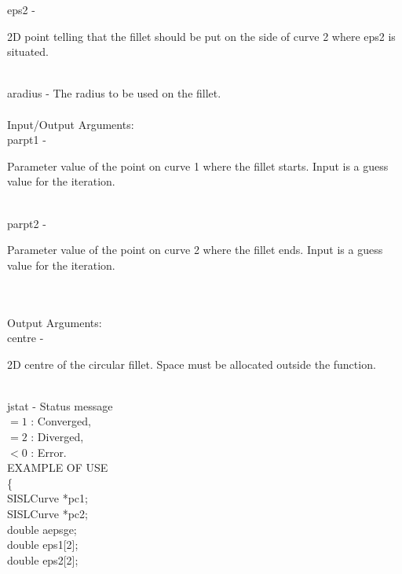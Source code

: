         \>\>    {\fov eps2}    \> - \>
        \begin{minipg2}
          2D point telling that the fillet should be put on the
          side of curve 2 where {\fov eps2} is situated.
        \end{minipg2}\\[0.8ex]
        \>\>    {\fov aradius} \> - \> The radius to be used on the fillet.\\
\\
        \>Input/Output Arguments:\\
        \>\>    {\fov parpt1}  \> - \>
        \begin{minipg2}
          Parameter value of the point on curve 1 where the
          fillet starts. Input is a guess value for the iteration.
        \end{minipg2}\\[0.8ex]
        \>\>    {\fov parpt2}  \> - \>
        \begin{minipg2}
          Parameter value of the point on curve 2 where the
          fillet ends. Input is a guess value for the iteration.
        \end{minipg2}\\[0.8ex]
\\
        \>Output Arguments:\\
        \>\>    {\fov centre}  \> - \>
        \begin{minipg2}
          2D centre of the circular fillet.  Space must be
          allocated outside the function.
        \end{minipg2}\\[0.8ex]
        \>\>    {\fov jstat} \> - \> Status message\\
                \>\>\>\>\> $= 1$      : Converged,\\
                \>\>\>\>\> $= 2$      : Diverged,\\
                \>\>\>\>\> $< 0$      : Error.\\
\newpagetabs
EXAMPLE OF USE\\
        \>      \{ \\
        \>\>    SISLCurve \> *{\fov pc1};\\
        \>\>    SISLCurve \> *{\fov pc2};\\
        \>\>    double    \> {\fov aepsge};\\
        \>\>    double    \> {\fov eps1}[2];\\
        \>\>    double    \> {\fov eps2}[2];\\
